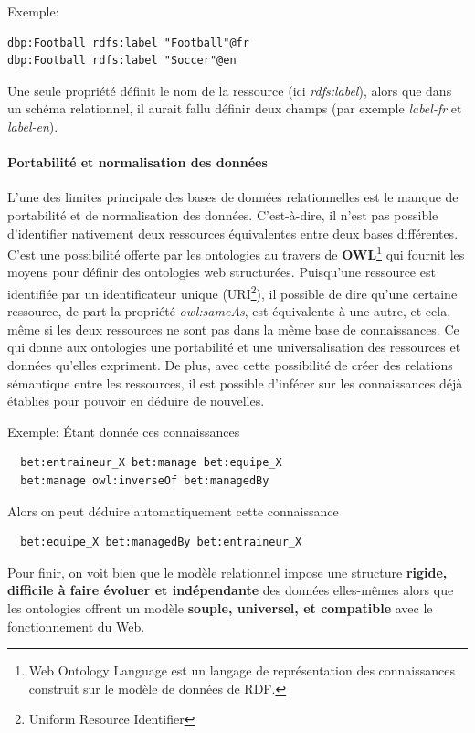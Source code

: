 \documentclass[oneside,13pt,a4paper]{article}
\begin{document}
Exemple:
\begin{lstlisting}
dbp:Football rdfs:label "Football"@fr
dbp:Football rdfs:label "Soccer"@en
\end{lstlisting}

Une seule propriété définit le nom de la ressource (ici \textit{rdfs:label}), alors que dans un schéma relationnel, il aurait fallu définir deux champs (par exemple \textit{label-fr} et \textit{label-en}).

\paragraph{Portabilité et normalisation des données} 

L’une des limites principale des bases de données relationnelles est le manque de portabilité et de normalisation des données. C’est-à-dire, il n’est pas possible d’identifier nativement deux ressources équivalentes entre deux bases différentes. C’est une possibilité offerte par les ontologies au travers de \textbf{OWL}\footnote{Web Ontology Language est un langage de représentation des connaissances construit sur le modèle de données de RDF.} qui fournit les moyens pour définir des ontologies web structurées. Puisqu’une ressource est identifiée par un identificateur unique (URI\footnote{Uniform Resource Identifier}), il possible de dire qu’une certaine ressource, de part la propriété \textit{owl:sameAs}, est équivalente à une autre, et cela, même si les deux ressources ne sont pas dans la même base de connaissances. Ce qui donne aux ontologies une portabilité et une universalisation des ressources et données qu’elles expriment.
De plus, avec cette possibilité de créer des relations sémantique entre les ressources, il est possible d’inférer sur les connaissances déjà établies pour pouvoir en déduire de nouvelles.

Exemple: Étant donnée ces connaissances
\begin{lstlisting}
  bet:entraineur_X bet:manage bet:equipe_X
  bet:manage owl:inverseOf bet:managedBy
\end{lstlisting}

Alors on peut déduire automatiquement cette connaissance

\begin{lstlisting}  
  bet:equipe_X bet:managedBy bet:entraineur_X
\end{lstlisting}

Pour finir, on voit bien que le modèle relationnel impose une structure \textbf{rigide, difficile à faire évoluer et indépendante} des données elles-mêmes alors que les ontologies offrent un modèle \textbf{souple, universel, et compatible} avec le fonctionnement du Web.
\end{document}
